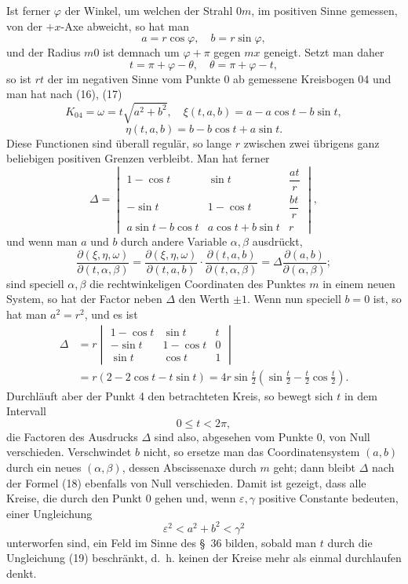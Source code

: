 \documentclass[11pt,a4paper,leqno]{article}
\begin{document}
Ist ferner $\varphi$ der Winkel, um welchen der Strahl $0m$, im positiven Sinne gemessen, von der $+x$-Axe abweicht, so hat man
\begin{equation}\tag{17}
 a=r\cos\varphi,\quad b=r\sin\varphi,
\end{equation}
und der Radius $m0$ ist demnach um $\varphi+\pi$ gegen $mx$ geneigt. Setzt man daher
\[
 t=\pi+\varphi-\theta,\quad \theta=\pi+\varphi-t,
\]
so ist $rt$ der im negativen Sinne vom Punkte 0 ab gemessene Kreisbogen 04 und man hat nach (16), (17)
\[
 K_{04}=\omega=t\sqrt{a^2+b^2},\quad
 \xi(t,a,b)=a-a\cos t-b\sin t,
\]
\[
 \eta(t,a,b)=b-b\cos t+a\sin t.
\]
Diese Functionen sind überall regulär, so lange $r$ zwischen zwei übrigens ganz beliebigen positiven Grenzen verbleibt. Man hat ferner
\[
\Delta=\begin{vmatrix}
1-\cos t&\sin t&\dfrac{at}{r}\\[1.0ex]
-\sin t&1-\cos t&\dfrac{bt}{r}\\[1.0ex]
a\sin t-b\cos t&a\cos t+b\sin t&r
\end{vmatrix},
\]
und wenn man $a$ und $b$ durch andere Variable $\alpha,\beta$ ausdrückt,
\begin{equation}\tag{18}
\frac{\partial(\xi,\eta,\omega)}{\partial(t,\alpha,\beta)}=
\frac{\partial(\xi,\eta,\omega)}{\partial(t,a,b)}\cdot
\frac{\partial(t,a,b)}{\partial(t,\alpha,\beta)}
=\Delta\frac{\partial(a,b)}{\partial(\alpha,\beta)};
\end{equation}
sind speciell $\alpha,\beta$ die rechtwinkeligen Coordinaten des Punktes $m$ in einem neuen System, so hat der Factor neben $\Delta$ den Werth
$\pm1$. Wenn nun speciell $b=0$ ist, so hat man $a^2=r^2$, und es ist
\[
\begin{aligned}
\Delta&=r\begin{vmatrix}
1-\cos t&\sin t&t\\
-\sin t&1-\cos t&0\\
\sin t&\cos t&1
\end{vmatrix}\\
&=r(2-2\cos t-t\sin t)=4r\sin\frac{t}{2}\left(\sin\frac{t}{2}-\frac{t}{2}\cos\frac{t}{2}\right).
\end{aligned}
\]
Durchläuft aber der Punkt 4 den betrachteten Kreis, so bewegt sich $t$ in dem Intervall
\begin{equation}\tag{19}
0\leq t<2\pi,
\end{equation}
die Factoren des Ausdrucks $\Delta$ sind also, abgesehen vom Punkte 0, von Null verschieden. Verschwindet $b$ nicht, so ersetze man das Coordinatensystem $(a,b)$ durch ein neues $(\alpha,\beta)$, dessen Abscissenaxe durch $m$ geht; dann bleibt $\Delta$ nach der Formel (18) ebenfalls von Null verschieden. Damit ist gezeigt, dass alle Kreise, die durch den Punkt 0 gehen und, wenn $\varepsilon,\gamma$ positive Constante bedeuten, einer Ungleichung
\begin{equation}\tag{20}
\varepsilon^2<a^2+b^2<\gamma^2
\end{equation}
unterworfen sind, ein Feld im Sinne des \S~36 bilden, sobald man $t$ durch die Ungleichung (19) beschränkt, d.~h. keinen der Kreise mehr als einmal durchlaufen denkt.
\end{document}
